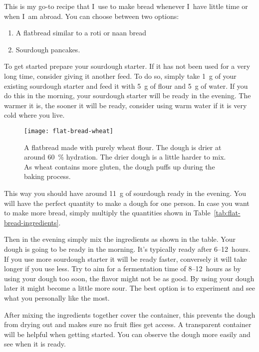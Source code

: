 This is my go-to recipe that I~use to make bread whenever
I~have little time or when I~am abroad. You can choose
between two options:
%
\begin{enumerate}
    \item A flatbread similar to a roti or naan bread
    \item Sourdough pancakes.
\end{enumerate}

To get started prepare your sourdough starter. If it has not been used for a very
long time, consider giving it another feed. To do so, simply take \qty{1}{\gram} of your
existing sourdough starter and feed it with \qty{5}{\gram} of flour and \qty{5}{\gram} of water.
If you do this in the morning, your sourdough starter will be ready in the evening. The
warmer it is, the sooner it will be ready,  consider
using warm water if it is very cold where you live.

\begin{figure}[htb!]
\centering
  \texttt{[image: flat-bread-wheat]}
  \caption[Wheat flatbread]{A flatbread made with purely wheat flour. The
      dough is drier at around \qty{60}{\percent} hydration. The drier dough
      is a little harder to mix. As wheat contains more gluten, the dough
      puffs up during the baking process.}
\end{figure}

This way you should have around \qty{11}{\gram} of sourdough ready in the evening. You will have
the perfect quantity to make a dough for one person. In case you want to make more
bread, simply multiply the quantities shown in
Table~\ref{tab:flat-bread-ingredients}.

Then in the evening simply mix the ingredients as shown in the table. Your dough
is going to be ready in the morning. It's typically ready after 6--12~hours. If
you use more sourdough starter it will be ready faster, conversely it will take
longer if you use less. Try to aim for a fermentation time of 8--12~hours as
by using your dough too soon, the flavor might not be as good. By using your
dough later it might become a little more sour. The best option is to
experiment and see what you personally like the most.

After mixing the ingredients together cover the container, this prevents the
dough from drying out and makes
sure no fruit flies get access. A transparent container will be helpful
when getting started. You can observe the dough more easily and see when
it is ready.

